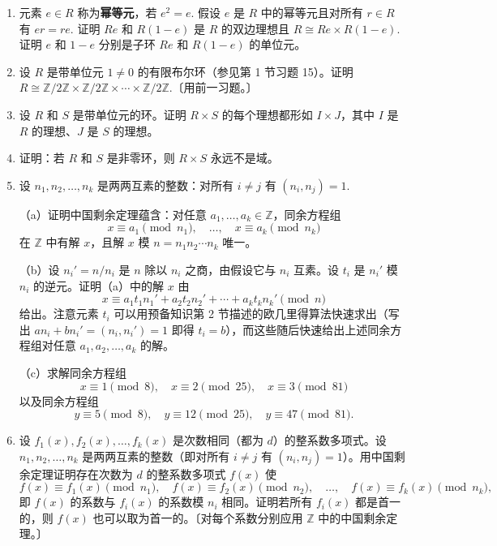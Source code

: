 \begin{enumerate}
\item 元素 \(e \in R\) 称为\textbf{幂等元}，若 \(e^2 = e\). 假设 \(e\) 是 \(R\) 中的幂等元且对所有 \(r \in R\) 有 \(er = re\). 证明 \(Re\) 和 \(R(1-e)\) 是 \(R\) 的双边理想且 \(R \cong Re \times R(1-e)\). 证明 \(e\) 和 \(1-e\) 分别是子环 \(Re\) 和 \(R(1-e)\) 的单位元。

\item 设 \(R\) 是带单位元 \(1 \neq 0\) 的有限布尔环（参见第 1 节习题 15）。证明 \(R \cong \mathbb{Z}/2\mathbb{Z} \times \mathbb{Z}/2\mathbb{Z} \times \cdots \times \mathbb{Z}/2\mathbb{Z}\).〔用前一习题。〕

\item 设 \(R\) 和 \(S\) 是带单位元的环。证明 \(R \times S\) 的每个理想都形如 \(I \times J\)，其中 \(I\) 是 \(R\) 的理想、\(J\) 是 \(S\) 的理想。

\item 证明：若 \(R\) 和 \(S\) 是非零环，则 \(R \times S\) 永远不是域。

\item 设 \(n_1, n_2, \ldots, n_k\) 是两两互素的整数：对所有 \(i \neq j\) 有 \((n_i, n_j) = 1\).

（a）证明中国剩余定理蕴含：对任意 \(a_1, \ldots, a_k \in \mathbb{Z}\)，同余方程组
\[
x \equiv a_1 \pmod{n_1},\quad \ldots,\quad x \equiv a_k \pmod{n_k}
\]
在 \(\mathbb{Z}\) 中有解 \(x\)，且解 \(x\) 模 \(n = n_1n_2\cdots n_k\) 唯一。

（b）设 \(n_i' = n/n_i\) 是 \(n\) 除以 \(n_i\) 之商，由假设它与 \(n_i\) 互素。设 \(t_i\) 是 \(n_i'\) 模 \(n_i\) 的逆元。证明（a）中的解 \(x\) 由
\[
x \equiv a_1t_1n_1' + a_2t_2n_2' + \cdots + a_kt_kn_k' \pmod{n}
\]
给出。注意元素 \(t_i\) 可以用预备知识第 2 节描述的欧几里得算法快速求出（写出 \(an_i + bn_i' = (n_i, n_i') = 1\) 即得 \(t_i = b\)），而这些随后快速给出上述同余方程组对任意 \(a_1, a_2, \ldots, a_k\) 的解。

（c）求解同余方程组
\[
x \equiv 1 \pmod 8,\quad x \equiv 2 \pmod{25},\quad x \equiv 3 \pmod{81}
\]
以及同余方程组
\[
y \equiv 5 \pmod 8,\quad y \equiv 12 \pmod{25},\quad y \equiv 47 \pmod{81}.
\]

\item 设 \(f_1(x), f_2(x), \ldots, f_k(x)\) 是次数相同（都为 \(d\)）的整系数多项式。设 \(n_1, n_2, \ldots, n_k\) 是两两互素的整数（即对所有 \(i \neq j\) 有 \((n_i, n_j) = 1\)）。用中国剩余定理证明存在次数为 \(d\) 的整系数多项式 \(f(x)\) 使
\[
f(x) \equiv f_1(x) \pmod{n_1},\quad f(x) \equiv f_2(x) \pmod{n_2},\quad \ldots,\quad f(x) \equiv f_k(x) \pmod{n_k},
\]
即 \(f(x)\) 的系数与 \(f_i(x)\) 的系数模 \(n_i\) 相同。证明若所有 \(f_i(x)\) 都是首一的，则 \(f(x)\) 也可以取为首一的。〔对每个系数分别应用 \(\mathbb{Z}\) 中的中国剩余定理。〕


\end{enumerate}
